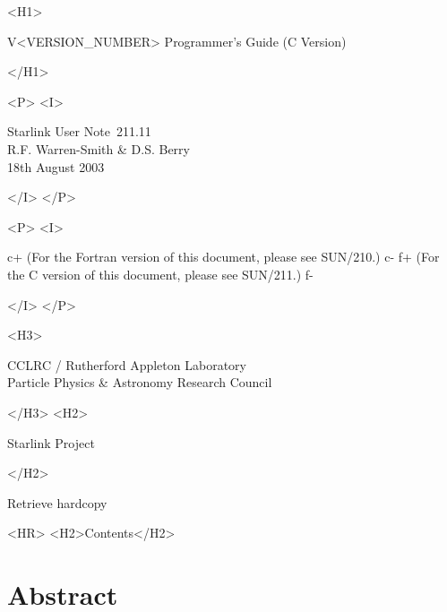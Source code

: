 \documentclass[twoside,11pt]{article}
\newcommand{\stardoccategory}  {Starlink User Note}
\newcommand{\stardocsource}    {sun\stardocnumber}
\newcommand{\stardocnumber}    {211.11}
\newcommand{\stardocnumber}    {210.11}
\newcommand{\stardocauthors}   {R.F. Warren-Smith \& D.S. Berry}
\newcommand{\stardocdate}      {18th August 2003}
\newcommand{\stardocversion}   {V<VERSION_NUMBER>}
\newcommand{\stardocmanualhtml}{Programmer's Guide (C Version)}
\newcommand{\stardocmanualhtml}{Programmer's Guide (Fortran Version)}
\newcommand{\htmladdnormallink}[2]{#1}
\newcommand{\htmladdimg}[1]{}
\newcommand{\htmlref}[2]{#1}
\newcommand{\htmladdtonavigation}[1]{}
\newcommand{\xref}[3]{#1}
\newcommand{\xlabel}[1]{}
\newcommand{\latexonlytoc}[0]{\tableofcontents}
\begin{document}
\begin{htmlonly}
   \begin{rawhtml} <H1> \end{rawhtml}
      \stardocversion
      \stardocmanualhtml
   \begin{rawhtml} </H1> \end{rawhtml}
   \begin{rawhtml} <P> <I> \end{rawhtml}
   \stardoccategory\ \stardocnumber \\
   \stardocauthors \\
   \stardocdate
   \begin{rawhtml} </I> </P> \end{rawhtml}
   \begin{rawhtml} <P> <I> \end{rawhtml}
c+
   (For the Fortran version of this document, please see
    \xref{SUN/210}{sun210}{}.)
c-
f+
   (For the C version of this document, please see \xref{SUN/211}{sun211}{}.)
f-
   \begin{rawhtml} </I> </P> \end{rawhtml}
   \begin{rawhtml} <H3> \end{rawhtml}
      \htmladdnormallink{CCLRC}{http://www.cclrc.ac.uk} /
      \htmladdnormallink{Rutherford Appleton Laboratory}
                        {http://www.cclrc.ac.uk/ral} \\
      \htmladdnormallink{Particle Physics \& Astronomy Research Council}
                        {http://www.pparc.ac.uk} \\
   \begin{rawhtml} </H3> <H2> \end{rawhtml}
      \htmladdnormallink{Starlink Project}{http://www.starlink.rl.ac.uk/}
   \begin{rawhtml} </H2> \end{rawhtml}
   \htmladdnormallink{\htmladdimg{source.gif} Retrieve hardcopy}
      {http://www.starlink.rl.ac.uk/cgi-bin/hcserver?\stardocsource}\\

  \label{stardoccontents}
  \begin{rawhtml} 
    <HR>
    <H2>Contents</H2>
  \end{rawhtml}
  \renewcommand{\latexonlytoc}[0]{}
  \htmladdtonavigation{\htmlref{\htmladdimg{contents_motif.gif}}
        {stardoccontents}}

  \section{\xlabel{abstract}Abstract}
\end{htmlonly}
\end{document}
